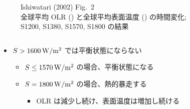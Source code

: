 \documentclass[aspectratio=149,9pt,fleqn]{beamer}
\begin{document}
\begin{frame}
\begin{columns}[b,onlytextwidth]
\begin{column}{.7\textwidth}
\begin{figure}
				Ishiwatari \etal (2002) Fig.~2\\
				全球平均 OLR () と全球平均表面温度 () の時間変化;\\
				S1200, S1380, S1570, S1800 の結果
			\end{figure}
		\end{column}
	\end{columns}
	\begin{itemize}
		\item \(S>1600\hmu{W/m^2}\) では平衡状態にならない
			\begin{itemize}
				\item \(S\leq1570\hmu{W/m^2}\) の場合、平衡状態になる
				\item \(S=1800\hmu{W/m^2}\) の場合、熱的暴走する
					\begin{itemize}
						\item OLR は減少し続け、表面温度は増加し続ける
					\end{itemize}
			\end{itemize}
	\end{itemize}
	\begin{columns}[T,onlytextwidth]
		\begin{column}{.7\textwidth}
		\end{column}
		\begin{column}{.3\textwidth}
		\end{column}
	\end{columns}
\end{frame}
\end{document}
